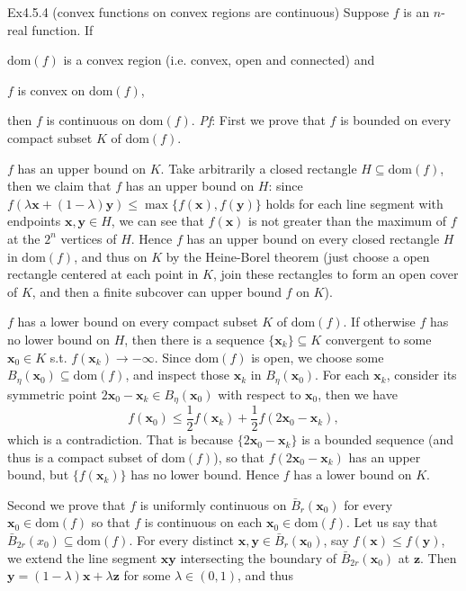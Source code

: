 \documentclass{article}
\begin{document}
\begin{Th}{Ex4.5.4 (convex functions on convex regions are continuous)}
    Suppose $f$ is an $n$-real function. If
    \begin{compactenum}
        \item $\text{dom}(f)$ is a convex region (i.e. convex, open and connected) and
        \item $f$ is convex on $\text{dom}(f)$,
    \end{compactenum}
    then $f$ is continuous on $\text{dom}(f)$.
    \tcblower
    \textit{Pf}: First we prove that $f$ is bounded on every compact subset $K$ of $\text{dom}(f)$. 
    \begin{compactenum}
        \item $f$ has an upper bound on $K$. Take arbitrarily a closed rectangle $H\subseteq\text{dom}(f)$, then we claim that $f$ has an upper bound on $H$: since $f(\lambda\pmb{x}+(1-\lambda)\pmb{y})\leq\max\{f(\pmb{x}), f(\pmb{y})\}$ holds for each line segment with endpoints $\pmb{x}, \pmb{y}\in H$, we can see that $f(\pmb{x})$ is not greater than the maximum of $f$ at the $2^n$ vertices of $H$. Hence $f$ has an upper bound on every closed rectangle $H$ in $\text{dom}(f)$, and thus on $K$ by the Heine-Borel theorem (just choose a open rectangle centered at each point in $K$, join these rectangles to form an open cover of $K$, and then a finite subcover can upper bound $f$ on $K$).
        \item $f$ has a lower bound on every compact subset $K$ of $\text{dom}(f)$. If otherwise $f$ has no lower bound on $H$, then there is a sequence $\{\pmb{x}_k\}\subseteq K$ convergent to some $\pmb{x}_0\in K$ s.t. $f(\pmb{x}_k)\rightarrow -\infty$. Since $\text{dom}(f)$ is open, we choose some $B_\eta(\pmb{x}_0)\subseteq\text{dom}(f)$, and inspect those $\pmb{x}_k$ in $B_\eta(\pmb{x}_0)$. For each $\pmb{x}_k$, consider its symmetric point $2\pmb{x}_0-\pmb{x}_k\in B_\eta(\pmb{x}_0)$ with respect to $\pmb{x}_0$, then we have
        $$ f(\pmb{x}_0)\leq \frac{1}{2}f(\pmb{x}_k)+\frac{1}{2}f(2\pmb{x}_0-\pmb{x}_k), $$
        which is a contradiction. That is because $\{2\pmb{x}_0-\pmb{x}_k\}$ is a bounded sequence (and thus is a compact subset of $\text{dom}(f)$), so that $f(2\pmb{x}_0-\pmb{x}_k)$ has an upper bound, but $\{f(\pmb{x}_k)\}$ has no lower bound. Hence $f$ has a lower bound on $K$.
    \end{compactenum}
    Second we prove that $f$ is uniformly continuous on $\bar{B}_r(\pmb{x}_0)$ for every $\pmb{x}_0\in\text{dom}(f)$ so that $f$ is continuous on each $\pmb{x}_0\in\text{dom}(f)$. Let us say that $\bar{B}_{2r}(x_0)\subseteq\text{dom}(f)$. For every distinct $\pmb{x}, \pmb{y}\in \bar{B}_r(\pmb{x}_0)$, say $f(\pmb{x})\leq f(\pmb{y})$, we extend the line segment $\pmb{x}\pmb{y}$ intersecting the boundary of $\bar{B}_{2r}(\pmb{x}_0)$ at $\pmb{z}$. Then $\pmb{y} = (1-\lambda)\pmb{x}+\lambda\pmb{z}$ for some $\lambda\in(0,1)$, and thus

\end{Th}
\end{document}
